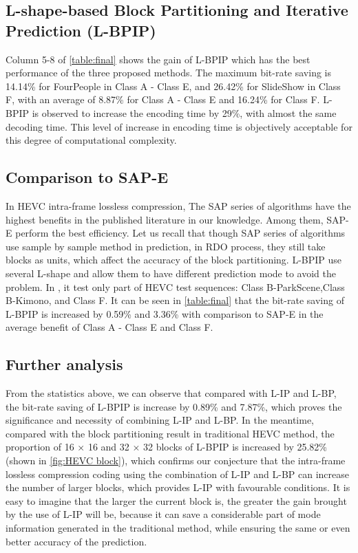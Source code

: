 \documentclass[journal]{IEEEtran}
\begin{document}
\subsection{L-shape-based Block Partitioning and Iterative Prediction (L-BPIP)}
Column 5-8 of \autoref{table:final} shows the gain of L-BPIP which has the best performance of the three proposed methods. The maximum bit-rate saving is 14.14\% for FourPeople in Class A - Class E, and 26.42\% for SlideShow in Class F, with an average of 8.87\% for Class A - Class E and 16.24\% for Class F. L-BPIP is observed to increase the encoding time by 29\%, with almost the same decoding time. This level of increase in encoding time is objectively acceptable for this degree of computational complexity.

\subsection{Comparison to SAP-E}
In HEVC intra-frame lossless compression, The SAP series of algorithms have the highest benefits in the published literature in our knowledge. Among them, SAP-E \cite{12} perform the best efficiency. Let us recall that though SAP series of algorithms use sample by sample method in prediction, in RDO process, they still take blocks as units, which affect the accuracy of the block partitioning. L-BPIP use several L-shape and allow them to have different prediction mode to avoid the problem. In \cite{12}, it test only part of HEVC test sequences: Class B-ParkScene,Class B-Kimono, and Class F. It can be seen in \autoref{table:final} that the bit-rate saving of L-BPIP is increased by 0.59\% and 3.36\% with comparison to SAP-E in the average benefit of Class A - Class E and Class F.
\subsection{Further analysis}
From the statistics above, we can observe that compared with L-IP and L-BP, the bit-rate saving of L-BPIP is increase by 0.89\% and 7.87\%, which proves the significance and necessity of combining L-IP and L-BP. In the meantime, compared with the block partitioning result in traditional HEVC method, the proportion of 16 × 16 and 32 × 32 blocks of L-BPIP is increased by 25.82\% (shown in \autoref{fig:HEVC block}), which confirms our conjecture that the intra-frame lossless compression coding using the combination of L-IP and L-BP can increase the number of larger blocks, which provides L-IP with favourable conditions. It is easy to imagine that the larger the current block is, the greater the gain brought by the use of L-IP will be, because it can save a considerable part of mode information generated in the traditional method, while ensuring the same or even better accuracy of the prediction.
\end{document}

